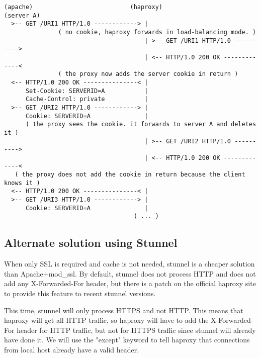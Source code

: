 \begin{verbatim}
(apache)                           (haproxy)                         (server A)
  >-- GET /URI1 HTTP/1.0 ------------> |
               ( no cookie, haproxy forwards in load-balancing mode. )
                                       | >-- GET /URI1 HTTP/1.0 ---------->
                                       | <-- HTTP/1.0 200 OK -------------<
               ( the proxy now adds the server cookie in return )
  <-- HTTP/1.0 200 OK ---------------< |
      Set-Cookie: SERVERID=A           |
      Cache-Control: private           |
  >-- GET /URI2 HTTP/1.0 ------------> |
      Cookie: SERVERID=A               |
      ( the proxy sees the cookie. it forwards to server A and deletes it )
                                       | >-- GET /URI2 HTTP/1.0 ---------->
                                       | <-- HTTP/1.0 200 OK -------------<
   ( the proxy does not add the cookie in return because the client knows it )
  <-- HTTP/1.0 200 OK ---------------< |
  >-- GET /URI3 HTTP/1.0 ------------> |
      Cookie: SERVERID=A               |
                                    ( ... )
\end{verbatim}

\subsection{Alternate solution using Stunnel}

When only SSL is required and cache is not needed, stunnel is a cheaper
solution than Apache+mod\_ssl. By default, stunnel does not process HTTP and
does not add any X-Forwarded-For header, but there is a patch on the official
haproxy site to provide this feature to recent stunnel versions.

This time, stunnel will only process HTTPS and not HTTP. This means that
haproxy will get all HTTP traffic, so haproxy will have to add the
X-Forwarded-For header for HTTP traffic, but not for HTTPS traffic since
stunnel will already have done it. We will use the "except" keyword to tell
haproxy that connections from local host already have a valid header.

